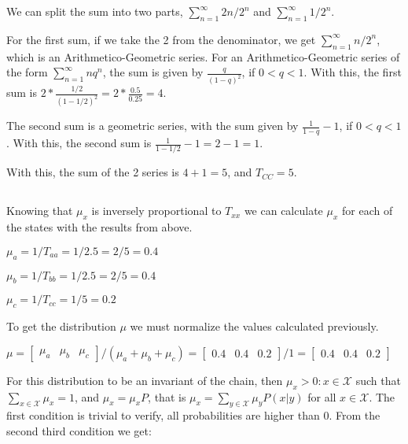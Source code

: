 \documentclass{article}
\begin{document}
We can split the sum into two parts, $\sum_{n=1}^{\infty} 2n / 2^n$ and $\sum_{n=1}^{\infty} 1 / 2^n$.

For the first sum, if we take the 2 from the denominator, we get $\sum_{n=1}^{\infty} n / 2^{n}$, which is an Arithmetico-Geometric series.
For an Arithmetico-Geometric series of the form $\sum_{n=1}^{\infty} nq^{n}$, the sum is given by $\frac{q}{(1 - q)^2}$, if $0 < q < 1$.
With this, the first sum is $ 2 * \frac{1/2}{(1 - 1/2)^2} = 2 * \frac{0.5}{0.25} = 4$.

The second sum is a geometric series, with the sum given by $\frac{1}{1 - q} - 1$, if $0 < q < 1$.
With this, the second sum is $\frac{1}{1 - 1/2} - 1 = 2 - 1 = 1$.

\bigskip

With this, the sum of the 2 series is $4 + 1 = 5$, and $T_{CC} = 5$.

\subsection{}

Knowing that $\mu_{x}$ is inversely proportional to $T_{xx}$ we can calculate $\mu_{x}$ for each of the states with the results from above.

\bigskip

$\mu_{a} = 1 / T_{aa} = 1 / 2.5 = 2 / 5 = 0.4$

$\mu_{b} = 1 / T_{bb} = 1 / 2.5 = 2 / 5 = 0.4$

$\mu_{c} = 1 / T_{cc} = 1 / 5 = 0.2$

\bigskip

To get the distribution $\mu$ we must normalize the values calculated previously.

\bigskip

$\mu = \begin{bmatrix} \mu_{a} & \mu_{b} & \mu_{c} \end{bmatrix} / (\mu_{a} + \mu_{b} + \mu_{c}) = \begin{bmatrix} 0.4 & 0.4 & 0.2 \end{bmatrix} / 1 = \begin{bmatrix} 0.4 & 0.4 & 0.2 \end{bmatrix}$

\bigskip

For this distribution to be an invariant of the chain, then $\mu_{x} > 0 : x \in \mathcal{X}$ such that 
$\sum_{x \in \mathcal{X}} \mu_{x} = 1$, and $\mu_{x} = \mu_{x}P$, that is $\mu_{x} = \sum_{y \in \mathcal{X}} \mu_{y}P(x | y)$ 
for all $x \in \mathcal{X}$.
The first condition is trivial to verify, all probabilities are higher than 0.
From the second third condition we get:
\end{document}
